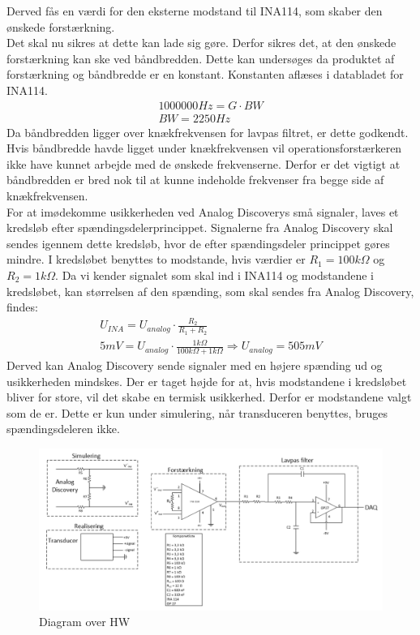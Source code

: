 Derved fås en værdi for den eksterne modstand til INA114, som skaber den ønskede forstærkning.\\
Det skal nu sikres at dette kan lade sig gøre. Derfor sikres det, at den ønskede forstærkning kan ske ved båndbredden. Dette kan undersøges da produktet af forstærkning og båndbredde er en konstant. Konstanten aflæses i databladet for INA114\cite{INA}. 
\begin{equation}
\begin{split}
1000000 Hz = G\cdot BW \\
BW = 2250 Hz
\end{split}
\end{equation}
Da båndbredden ligger over knækfrekvensen for lavpas filtret, er dette godkendt. Hvis båndbredde havde ligget under knækfrekvensen vil operationsforstærkeren ikke have kunnet arbejde med de ønskede frekvenserne. Derfor er det vigtigt at båndbredden er bred nok til at kunne indeholde frekvenser fra begge side af knækfrekvensen.\\
\newline 
For at imødekomme usikkerheden ved Analog Discoverys små signaler, laves et kredsløb efter spændingsdelerprincippet. Signalerne fra Analog Discovery skal sendes igennem dette kredsløb, hvor de efter spændingsdeler princippet gøres mindre. I kredsløbet benyttes to modstande, hvis værdier er $ R_1=100k\Omega $ og $ R_2 = 1k\Omega $. Da vi kender signalet som skal ind i INA114 og modstandene i kredsløbet, kan størrelsen af den spænding, som skal sendes fra Analog Discovery, findes:
\begin{equation}
\begin{split}
U_{INA} = U_{analog} \cdot \frac{R_2}{R_1 + R_2} \\
5mV = U_{analog}\cdot \frac{1k\Omega}{100k\Omega+1k\Omega} \Rightarrow U_{analog}= 505mV
\end{split}
\end{equation} 
Derved kan Analog Discovery sende signaler med en højere spænding ud og usikkerheden mindskes. Der er taget højde for at, hvis modstandene i kredsløbet bliver for store, vil det skabe en termisk usikkerhed. Derfor er modstandene valgt som de er. Dette er kun under simulering, når transduceren benyttes, bruges spændingsdeleren ikke.  
\begin{figure}[H]
	\centering
	\includegraphics[width=1.0\textwidth]{Figurer/diagram_over_HW}
	\caption{Diagram over HW}
	\label{fig:HW}
\end{figure}


